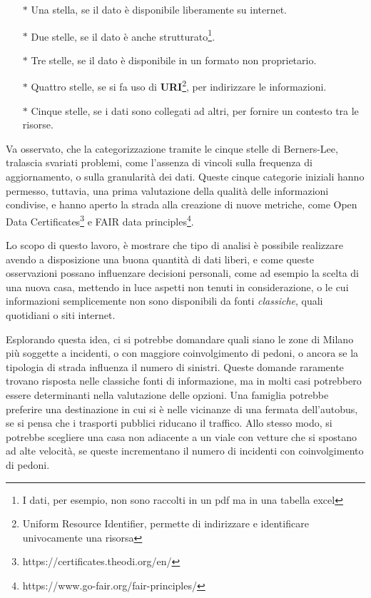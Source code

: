 \documentclass[a4paper,12pt]{report}
\newcommand{\quotestyle}[1]{\textit{#1}}
\newcommand{\skipline}{\vspace{0.2in}}
\begin{document}
\begin{itemize}
    \item[$\ast$] Una stella, se il dato è disponibile liberamente su internet. 
    \item[$\ast$] Due stelle, se il dato è anche strutturato\footnote{I dati, 
    per esempio, non sono raccolti in un pdf ma in una tabella excel}. 
    \item[$\ast$] Tre stelle, se il dato è disponibile in un formato non proprietario. 
    \item[$\ast$] Quattro stelle, se si fa uso 
    di \textbf{URI}\footnote{Uniform Resource Identifier, permette di indirizzare e 
    identificare univocamente una risorsa}, per indirizzare le informazioni. 
    \item[$\ast$] Cinque stelle, se i dati sono collegati ad altri, 
    per fornire un contesto tra le risorse. 
\end{itemize}

Va osservato, che la categorizzazione tramite le cinque stelle di Berners-Lee, 
tralascia svariati problemi, come l'assenza di vincoli sulla 
frequenza di aggiornamento, o sulla granularità dei dati. 
Queste cinque categorie iniziali hanno permesso, tuttavia, una prima valutazione 
della qualità delle informazioni condivise, 
e hanno aperto la strada alla creazione di nuove metriche, come 
Open Data Certificates\footnote{https://certificates.theodi.org/en/} e FAIR data 
principles\footnote{https://www.go-fair.org/fair-principles/}. 

\skipline
Lo scopo di questo lavoro, è mostrare che tipo di analisi è possibile realizzare 
avendo a disposizione una buona quantità di dati liberi, e come queste osservazioni possano 
influenzare decisioni personali, come ad esempio la scelta di una nuova casa, 
mettendo in luce aspetti non tenuti in considerazione, o le cui informazioni semplicemente 
non sono disponibili da fonti \quotestyle{classiche}, quali quotidiani o siti internet. 

Esplorando questa idea, ci si potrebbe domandare quali siano le zone 
di Milano più soggette a incidenti, o con maggiore coinvolgimento di pedoni, 
o ancora se la tipologia di strada influenza il numero di sinistri. 
Queste domande raramente trovano risposta nelle classiche fonti di informazione, 
ma in molti casi potrebbero essere determinanti nella valutazione delle opzioni. 
Una famiglia potrebbe preferire una destinazione in cui si è nelle 
vicinanze di una fermata dell'autobus, se si pensa che i trasporti pubblici riducano 
il traffico. 
Allo stesso modo, si potrebbe scegliere una casa non adiacente 
a un viale con vetture che si spostano ad alte velocità, se queste incrementano 
il numero di incidenti con coinvolgimento di pedoni. 
\end{document}
